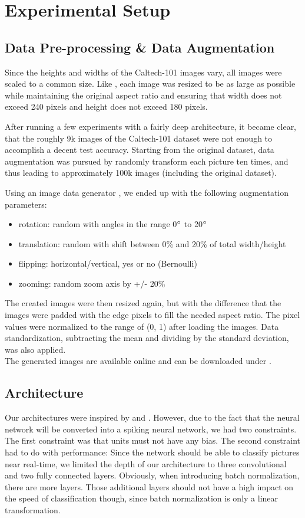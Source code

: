 \documentclass[a4paper, 11pt]{article}
\begin{document}
\section{Experimental Setup}

\subsection{Data Pre-processing \& Data Augmentation}
Since the heights and widths of the Caltech-101 images vary, all images were scaled to a common size. 
Like \citet{Orchard2015}, each image was resized to be as large as possible while maintaining the original aspect ratio and ensuring that width does not exceed 240 pixels and height does not exceed 180 pixels.

After running a few experiments with a fairly deep architecture, it became clear, that the roughly 9k images of the Caltech-101 dataset were not enough to accomplish a decent test accuracy.
Starting from the original dataset, data augmentation was pursued by randomly transform each picture ten times, and thus leading to approximately 100k images (including the original dataset).

Using an image data generator \cite{keras}, we ended up with the following augmentation parameters:
\begin{itemize}
	\item rotation: random with angles in the range 0$\degree$ to 20$\degree$
	\item translation: random with shift between 0\% and 20\% of total width/height
	\item flipping: horizontal/vertical, yes or no (Bernoulli)
	\item zooming: random zoom axis by +/- 20\%
\end{itemize}

The created images were then resized again, but with the difference that the images were padded with the edge pixels to fill the needed aspect ratio.
The pixel values were normalized to the range of (0, 1) after loading the images.
Data standardization, subtracting the mean and dividing by the standard deviation, was also applied.\\

The generated images are available online and can be downloaded under \cite{UnternaehrerGenImg}.


\subsection{Architecture}
Our architectures were inspired by \citet{Simonyan2015} and \citet{CS231nCNN}.
However, due to the fact that the neural network will be converted into a spiking neural network, we had two constraints.
The first constraint was that units must not have any bias.
The second constraint had to do with performance: Since the network should be able to classify pictures near real-time, we limited the depth of our architecture to three convolutional and two fully connected layers.
Obviously, when introducing batch normalization, there are more layers.
Those additional layers should not have a high impact on the speed of classification though, since batch normalization is only a linear transformation.
\end{document}
